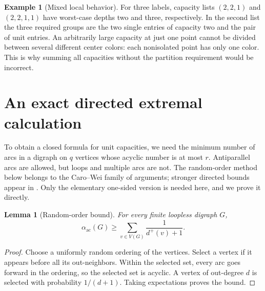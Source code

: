 \documentclass[11pt,letterpaper]{article}
\numberwithin{equation}{section}
\newtheorem{lemma}[lemma]{Lemma}
\theoremstyle{definition}
\newtheorem{example}[example]{Example}
\theoremstyle{remark}
\theoremstyle{definition}
\newcommand{\ac}{\alpha_{\mathrm{ac}}}
\begin{document}
\begin{example}[Mixed local behavior]
For three labels, capacity lists \((2,2,1)\) and \((2,2,1,1)\) have
worst-case depths two and three, respectively. In the second list the
three required groups are the two single entries of capacity two and the
pair of unit entries. An arbitrarily large capacity at just one point
cannot be divided between several different center colors: each
nonisolated point has only one color. This is why summing all capacities
without the partition requirement would be incorrect.
\end{example}

\section{An exact directed extremal calculation}
\label{fp:sec:extremal}

To obtain a closed formula for unit capacities, we need the minimum number
of arcs in a digraph on \(q\) vertices whose acyclic number is at most
\(r\). Antiparallel arcs are allowed, but loops and multiple arcs are not.
The random-order method below belongs to the Caro--Wei family of arguments;
stronger directed bounds appear in \cite{AGJS,AFH}. Only the elementary
one-sided version is needed here, and we prove it directly.

\begin{lemma}[Random-order bound]\label{fp:lem:random}
For every finite loopless digraph \(G\),
\[
 \ac(G)\geq\sum_{v\in V(G)}\frac{1}{d^+(v)+1}.
\]
\end{lemma}
\begin{proof}
Choose a uniformly random ordering of the vertices. Select a vertex if it
appears before all its out-neighbors. Within the selected set, every arc
goes forward in the ordering, so the selected set is acyclic. A vertex of
out-degree \(d\) is selected with probability \(1/(d+1)\). Taking
expectations proves the bound.
\end{proof}
\end{document}
